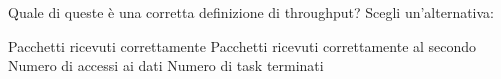 \question
Quale di queste è una corretta definizione di throughput?
Scegli un'alternativa:

\begin{checkboxes}
	\choice Pacchetti ricevuti correttamente
	\CorrectChoice Pacchetti ricevuti correttamente al secondo
	\choice Numero di accessi ai dati
	\choice Numero di task terminati
\end{checkboxes}
